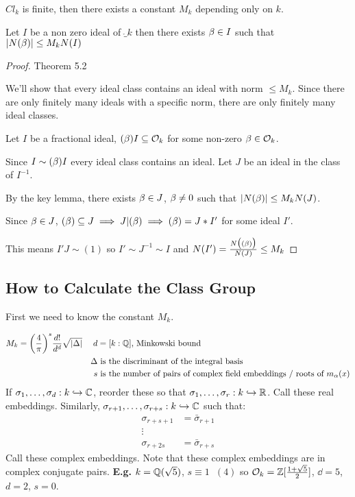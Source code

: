 \documentclass[11pt]{article}
\begin{document}
\begin{theorem}
$Cl_k$ is finite, then there exists a constant $M_k$ depending only on $k$.
\end{theorem}
\begin{lemma}
	Let $I$ be a non zero ideal of $\ring_k$ then there exists $\beta \in I$ such that $|N(\beta)| \leq M_kN(I)$
\end{lemma}
\begin{proof}
Theorem 5.2

We'll show that every ideal class contains an ideal with norm $\leq M_k$.
Since there are only finitely many ideals with a specific norm, there are only finitely many ideal classes.
\spa

	Let $I$ be a fractional ideal, $(\beta) I \subseteq \mathcal{O}_k$ for some non-zero $\beta \in \mathcal{O}_k$.
\spa

	Since  $I \sim (\beta) I$ every ideal class contains an ideal.
	Let $J$ be an ideal in the class of $I^{-1}$.
\spa

	By the key lemma, there exists $\beta \in J$, $\beta \neq 0$ such that $|N(\beta)| \leq M_k N(J)$. 
	\spa

	Since $\beta \in J$, $(\beta) \subseteq J \implies J | (\beta) \implies (\beta) = J*I'$ for some ideal $I'$.
\spa

	This means $I'J \sim (1)$ so $I' \sim J^{-1} \sim I$ and $N(I') = \frac{N\big((\beta)\big)}{N(J)} \leq M_k$




\end{proof}


\subsection{How to Calculate the Class Group}

First we need to know the constant $M_k$.

\begin{align*}
	M_k = \bigg(\frac4\pi\bigg)^s \frac{d!}{d^d} \sqrt{|\Delta|} && d&=[k:\mathbb{Q}] \text{, Minkowski bound}\\
	&& \Delta& \text{ is the discriminant of the integral basis}\\
	&& s&  \text{ is the number of pairs of complex field embeddings / roots of $m_\alpha(x)$}
\end{align*}
\spac
If $\sigma_1, \dots, \sigma_d : k \hookrightarrow \mathbb{C}$, reorder these so that $\sigma_1, \dots, \sigma_r : k \hookrightarrow \mathbb{R}$.
Call these real embeddings.
Similarly,
$\sigma_{r+1} , \dots, \sigma_{r+s} : k \hookrightarrow \mathbb{C}$ such that:
\begin{align*}
	\sigma_{r+s+1} &= \bar \sigma_{r+1}\\
	\vdots &\\
	\sigma_{r+2s} & = \bar \sigma_{r+s}
\end{align*}
Call these complex embeddings. Note that these complex embeddings are in complex conjugate pairs.
\spac
\textbf{E.g.} $k = \mathbb{Q}(\sqrt{5} ) $, $s \equiv 1 \hspace{7pt} (4)$ so $\mathcal{O}_k = \mathbb{Z} [\frac{1+\sqrt{5}}{2}]$, $\dd = 5$, $d = 2$, $s =0$.
\end{document}
